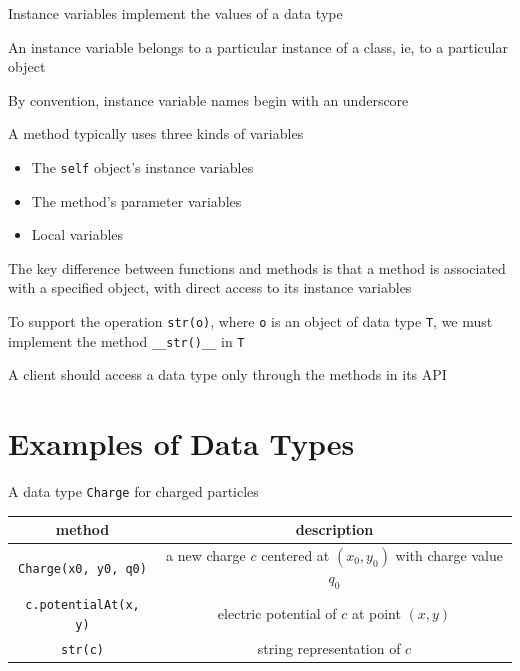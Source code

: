 \documentclass[8pt,a4paper,compress]{beamer}
\begin{document}
\begin{frame}[fragile]
\pause

Instance variables implement the values of a data type 

\pause
\bigskip

An instance variable belongs to a particular instance of a class, ie, to a particular object 

\pause
\bigskip

By convention, instance variable names begin with an underscore

\pause
\bigskip

A method typically uses three kinds of variables
\begin{itemize}
\pause
\item The \lstinline{self} object's instance variables

\pause
\item The method's parameter variables

\pause
\item Local variables
\end{itemize}

\pause
\bigskip

The key difference between functions and methods is that a method is associated with a specified object, with direct access to its instance variables

\pause
\bigskip

To support the operation \lstinline{str(o)}, where \lstinline{o} is an object of data type \lstinline{T}, we must implement the method \lstinline{__str()__} in \lstinline{T}

\pause
\bigskip

A client should access a data type only through the methods in its API
\end{frame}

\section{Examples of Data Types}

\begin{frame}[fragile]
\pause

A data type \lstinline{Charge} for charged particles
\begin{center}
\begin{tabular}{cc}
method & description \\ \hline
\lstinline$Charge(x0, y0, q0)$ & a new charge $c$ centered at $(x_0, y_0)$ with charge value $q_0$ \\
\lstinline$c.potentialAt(x, y)$ & electric potential of $c$ at point $(x, y)$ \\
\lstinline$str(c)$ & string representation of $c$
\end{tabular} 
\end{center}
\end{frame}
\end{document}

